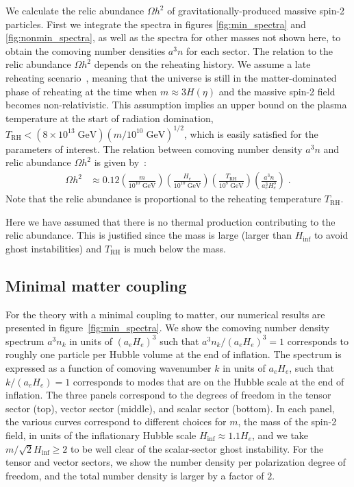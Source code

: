 \documentclass[11pt,a4paper]{article}
\newcommand{\bes}[1]{\begin{equation}\begin{split} #1 \end{split}\end{equation}}
\newcommand{\GeV}{{\; \mathrm{GeV}}}
\newcommand{\fref}[1]{figure~\ref{#1}}
\begin{document}
We calculate the relic abundance $\Omega h^2$ of gravitationally-produced massive spin-2 particles.  First we integrate the spectra in figures \ref{fig:min_spectra} and \ref{fig:nonmin_spectra}, as well as the spectra for other masses not shown here, to obtain the comoving number densities $a^3 n$ for each sector.  The relation to the relic abundance $\Omega h^2$ depends on the reheating history.  We assume a late reheating scenario~\cite{Kolb:2020fwh}, meaning that the universe is still in the matter-dominated phase of reheating at the time when $m \approx 3 H(\eta)$ and the massive spin-2 field becomes non-relativistic.  This assumption implies an upper bound on the plasma temperature at the start of radiation domination, $T_\mathrm{RH} < (8 \times 10^{13} \GeV) (m / 10^{10} \GeV)^{1/2}$, which is easily satisfied for the parameters of interest.  The relation between comoving number density $a^3 n$ and relic abundance $\Omega h^2$ is given by~\cite{Kolb:2020fwh,Ling:2021zlj}:
\bes{\label{eq:relic_abundance}
    \Omega h^2 
    & \approx 
   0.12
    \left(\frac{m}{10^{10} \GeV}\right)
    \left(\frac{H_e}{10^{10} \GeV}\right)
    \left(\frac{T_{\mathrm{RH}}}{10^{8} \GeV}\right)
    \left(\frac{a^3 n}{a_e^3 H_e^3}\right) 
    \;.
}
Note that the relic abundance is proportional to the reheating temperature $T_\mathrm{RH}$.

Here we have assumed that there is no thermal production contributing to the relic abundance.  This is justified since the mass is large (larger than $H_\mathrm{inf}$ to avoid ghost instabilities) and $T_\mathrm{RH}$ is much below the mass.

\subsection{Minimal matter coupling}
\label{sub:minimal_matter_GPP}

For the theory with a minimal coupling to matter, our numerical results are presented in \fref{fig:min_spectra}.  We show the comoving number density spectrum $a^3 n_k$ in units of $(a_e H_e)^3$ such that $a^3 n_k / (a_e H_e)^3 = 1$ corresponds to roughly one particle per Hubble volume at the end of inflation.  The spectrum is expressed as a function of comoving wavenumber $k$ in units of $a_e H_e$, such that $k/(a_e H_e) = 1$ corresponds to modes that are on the Hubble scale at the end of inflation.  The three panels correspond to the degrees of freedom in the tensor sector (top), vector sector (middle), and scalar sector (bottom).  In each panel, the various curves correspond to different choices for $m$, the mass of the spin-2 field, in units of the inflationary Hubble scale $H_\mathrm{inf} \approx 1.1 H_e$, and we take $m / \sqrt{2} H_\mathrm{inf} \geq 2$ to be well clear of the scalar-sector ghost instability.  For the tensor and vector sectors, we show the number density per polarization degree of freedom, and the total number density is larger by a factor of $2$.  
\end{document}
